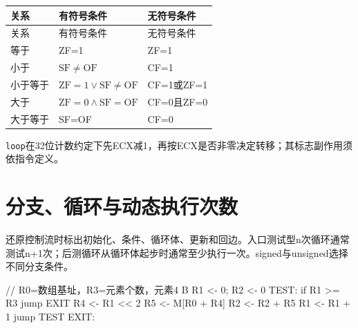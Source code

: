 \par\smallskip
{\fontsize{9.3}{12}\selectfont\setlength{\tabcolsep}{2.5pt}\setlength{\LTleft}{0pt}\setlength{\LTright}{0pt}
\begin{longtable}{@{}>{\raggedright\arraybackslash}p{}>{\raggedright\arraybackslash}p{}>{\raggedright\arraybackslash}p{}@{}}
\toprule
关系 & 有符号条件 & 无符号条件 \\

\midrule\endfirsthead\toprule
关系 & 有符号条件 & 无符号条件 \\

\midrule\endhead\bottomrule\endfoot
等于 & ZF=1 & ZF=1 \\

小于 & \(\mathrm{SF}\ne\mathrm{OF}\) & CF=1 \\

小于等于 & \(\mathrm{ZF}=1\lor\mathrm{SF}\ne\mathrm{OF}\) & CF=1或ZF=1 \\

大于 & \(\mathrm{ZF}=0\land\mathrm{SF}=\mathrm{OF}\) & CF=0且ZF=0 \\

大于等于 & SF=OF & CF=0 \\

\end{longtable}}
\par\smallskip

\texttt{loop}在32位计数约定下先ECX减1，再按ECX是否非零决定转移；其标志副作用须依指令定义。

\section{分支、循环与动态执行次数}\label{CO04-flow}

还原控制流时标出初始化、条件、循环体、更新和回边。入口测试型n次循环通常测试n+1次；后测循环从循环体起步时通常至少执行一次。signed与unsigned选择不同分支条件。

\par\smallskip\noindent\begin{minipage}{\linewidth}
\begin{codeblock}[language={}]
// R0=数组基址，R3=元素个数，元素4 B
R1 <- 0; R2 <- 0
TEST:
    if R1 >= R3 jump EXIT
    R4 <- R1 << 2
    R5 <- M[R0 + R4]
    R2 <- R2 + R5
    R1 <- R1 + 1
    jump TEST
EXIT:
\end{codeblock}
\end{minipage}\par\smallskip

